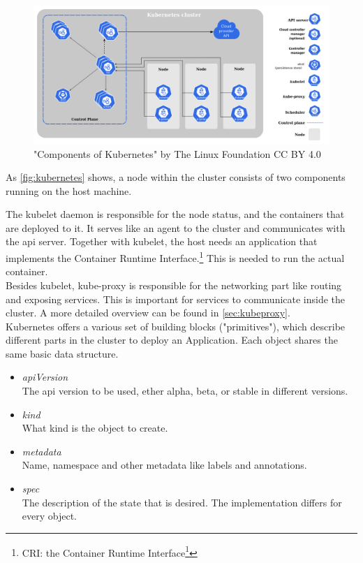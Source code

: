 \begin{figure}[H]
    \centering
    \includegraphics[width=1\linewidth]{media/02/kubernetes}
    \caption{"Components of Kubernetes" by The Linux Foundation CC BY 4.0}
    \label{fig:kubernetes}
\end{figure}

As \autoref{fig:kubernetes} shows, a node within the cluster consists of two components running on the host machine.

The kubelet daemon is responsible for the node status, and the containers that are deployed to it.
It serves like an agent to the cluster and communicates with the api server.
Together with kubelet, the host needs an application that implements the Container Runtime Interface.\footnote{CRI: the Container Runtime Interface\footcite{CRI}}
This is needed to run the actual container.
\\
Besides kubelet, kube-proxy is responsible for the networking part like routing and exposing services.
This is important for services to communicate inside the cluster.
A more detailed overview can be found in \autoref{sec:kubeproxy}.\cite{KUBERNETES-COMPONENTS}
\\

Kubernetes offers a various set of building blocks ("primitives"), which describe different parts in the cluster to deploy an Application.
Each object shares the same basic data structure.

\begin{itemize}
    \item \textit{apiVersion} \\
    The api version to be used, ether alpha, beta, or stable in different versions.
    \item \textit{kind} \\
    What kind is the object to create.
    \item \textit{metadata} \\
    Name, namespace and other metadata like labels and annotations.
    \item \textit{spec} \\
    The description of the state that is desired.
    The implementation differs for every object.
\end{itemize}

